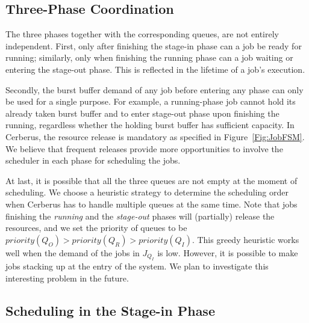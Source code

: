 \subsection{Three-Phase Coordination}
The three phases together with the corresponding queues, are not entirely independent.
First, only after finishing the stage-in phase can a job be ready for running;
similarly, only when finishing the running phase can a job waiting or entering the stage-out phase.
This is reflected in the lifetime of a job's execution.

Secondly,  the burst buffer demand of any job before entering any phase can only be used for a single purpose.
For example, a running-phase job cannot hold its already taken burst buffer
and to enter stage-out phase upon finishing the running, regardless whether the holding burst buffer has sufficient capacity.
In Cerberus, the resource release is mandatory as specified in Figure~\ref{Fig:JobFSM}.
We believe that frequent releases provide more opportunities to involve the scheduler in each phase for scheduling the jobs.

At last, it is possible that all the three queues are not empty at the moment of scheduling.
We choose a heuristic strategy to determine the scheduling order when
Cerberus has to handle multiple queues at the same time.
Note that jobs finishing the \textit{running} and the \textit{stage-out} phases
will (partially) release the resources, and we set the priority of queues to be $priority(Q_O) > priority(Q_R) > priority(Q_I)$.
This greedy heuristic works well when the demand of the jobs in $J_{Q_I}$ is low.
However, it is possible to make jobs stacking up at the entry of the system.
We plan to investigate this interesting problem in the future.



\subsection{Scheduling in the Stage-in Phase}
\label{SubSec:OptStageIn}

